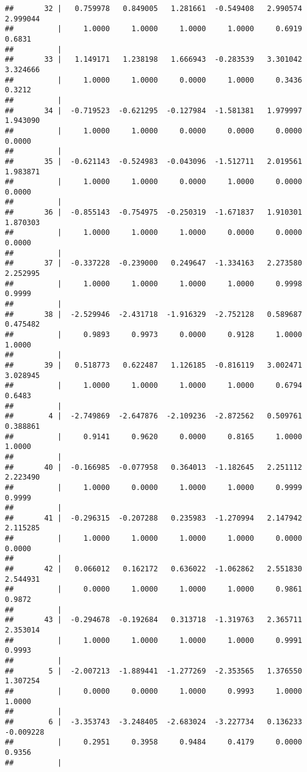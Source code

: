 \documentclass[12pt,]{article}
\begin{document}
\begin{verbatim}
##       32 |   0.759978   0.849005   1.281661  -0.549408   2.990574   2.999044
##          |     1.0000     1.0000     1.0000     1.0000     0.6919     0.6831
##          |
##       33 |   1.149171   1.238198   1.666943  -0.283539   3.301042   3.324666
##          |     1.0000     1.0000     0.0000     1.0000     0.3436     0.3212
##          |
##       34 |  -0.719523  -0.621295  -0.127984  -1.581381   1.979997   1.943090
##          |     1.0000     1.0000     0.0000     0.0000     0.0000     0.0000
##          |
##       35 |  -0.621143  -0.524983  -0.043096  -1.512711   2.019561   1.983871
##          |     1.0000     1.0000     0.0000     1.0000     0.0000     0.0000
##          |
##       36 |  -0.855143  -0.754975  -0.250319  -1.671837   1.910301   1.870303
##          |     1.0000     1.0000     1.0000     0.0000     0.0000     0.0000
##          |
##       37 |  -0.337228  -0.239000   0.249647  -1.334163   2.273580   2.252995
##          |     1.0000     1.0000     1.0000     1.0000     0.9998     0.9999
##          |
##       38 |  -2.529946  -2.431718  -1.916329  -2.752128   0.589687   0.475482
##          |     0.9893     0.9973     0.0000     0.9128     1.0000     1.0000
##          |
##       39 |   0.518773   0.622487   1.126185  -0.816119   3.002471   3.028945
##          |     1.0000     1.0000     1.0000     1.0000     0.6794     0.6483
##          |
##        4 |  -2.749869  -2.647876  -2.109236  -2.872562   0.509761   0.388861
##          |     0.9141     0.9620     0.0000     0.8165     1.0000     1.0000
##          |
##       40 |  -0.166985  -0.077958   0.364013  -1.182645   2.251112   2.223490
##          |     1.0000     0.0000     1.0000     1.0000     0.9999     0.9999
##          |
##       41 |  -0.296315  -0.207288   0.235983  -1.270994   2.147942   2.115285
##          |     1.0000     1.0000     1.0000     1.0000     0.0000     0.0000
##          |
##       42 |   0.066012   0.162172   0.636022  -1.062862   2.551830   2.544931
##          |     0.0000     1.0000     1.0000     1.0000     0.9861     0.9872
##          |
##       43 |  -0.294678  -0.192684   0.313718  -1.319763   2.365711   2.353014
##          |     1.0000     1.0000     1.0000     1.0000     0.9991     0.9993
##          |
##        5 |  -2.007213  -1.889441  -1.277269  -2.353565   1.376550   1.307254
##          |     0.0000     0.0000     1.0000     0.9993     1.0000     1.0000
##          |
##        6 |  -3.353743  -3.248405  -2.683024  -3.227734   0.136233  -0.009228
##          |     0.2951     0.3958     0.9484     0.4179     0.0000     0.9356
##          |

\end{verbatim}
\end{document}
